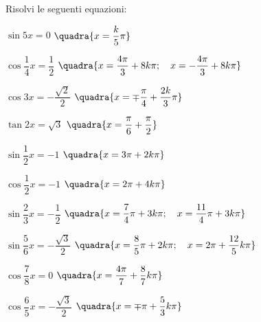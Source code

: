 \begin{esercizio}\label{ese:03.1}
Risolvi le seguenti equazioni:
 \begin{enumeratea}
  \item $\sin 5x = 0$
   \hfill $\quadra{x = \dfrac{k}{5} \pi}$
  \item $\cos \dfrac{1}{4} x = \dfrac{1}{2}$
   \hfill $\quadra{x = \dfrac{4 \pi}{3} + 8k \pi; \quad
                   x = -\dfrac{4\pi}{3} + 8k \pi}$
  \item $\cos 3x = -\dfrac{\sqrt{2}}{2}$
   \hfill $\quadra{x = \mp \dfrac{\pi}{4} + \dfrac{2k}{3} \pi}$
  \item $\tan 2x = \sqrt{3}$
   \hfill $\quadra{x = \dfrac{\pi}{6} + \dfrac{\pi}{2}}$
  \item $\sin \dfrac{1}{2} x = -1$
   \hfill $\quadra{x = 3\pi + 2k \pi}$
  \item $\cos \dfrac{1}{2} x = -1$
   \hfill $\quadra{x = 2 \pi + 4k \pi}$
  \item $\sin \dfrac{2}{3} x = -\dfrac{1}{2}$
   \hfill $\quadra{x = \dfrac{7}{4}\pi + 3k \pi; \quad
                   x = \dfrac{11}{4}\pi + 3k \pi}$
  \item $\sin \dfrac{5}{6} x = -\dfrac{\sqrt{3}}{2}$
   \hfill $\quadra{x = \dfrac{8}{5}\pi + 2k \pi; \quad
                   x = 2 \pi + \dfrac{12}{5} k \pi}$
  \item $\cos \dfrac{7}{8}x = 0$
   \hfill $\quadra{x = \dfrac{4\pi}{7} + \dfrac{8}{7}k \pi}$
  \item $\cos \dfrac{6}{5}x = -\dfrac{\sqrt{3}}{2}$
   \hfill $\quadra{x = \mp \pi + \dfrac{5}{3} k \pi}$
 \end{enumeratea}
\end{esercizio}

